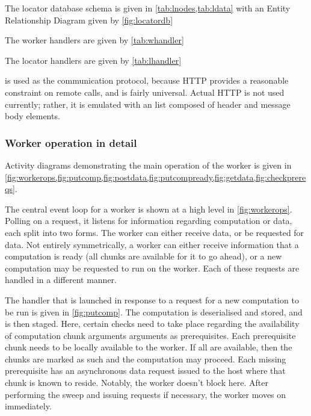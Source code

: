 



The locator database schema is given in \cref{tab:lnodes,tab:ldata} with an Entity Relationship Diagram given by \cref{fig:locatordb}




The worker handlers are given by \cref{tab:whandler}


The locator handlers are given by \cref{tab:lhandler}


 is used as the communication protocol, because HTTP provides a reasonable constraint on remote calls, and is fairly universal.
Actual HTTP is not used currently; rather, it is emulated with an \R{} list composed of header and message body elements.

\subsubsection{Worker operation in detail}

Activity diagrams demonstrating the main operation of the worker is given in \cref{fig:workerops,fig:putcomp,fig:postdata,fig:putcompready,fig:getdata,fig:checkprereqs}.

The central event loop for a worker is shown at a high level in \cref{fig:workerops}.
Polling on a request, it listens for information regarding computation or data, each split into two forms.
The worker can either receive data, or be requested for data.
Not entirely symmetrically, a worker can either receive information that a computation is ready (all chunks are available for it to go ahead), or a new computation may be requested to run on the worker.
Each of these requests are handled in a different manner.


The handler that is launched in response to a request for a new computation to be run is given in \cref{fig:putcomp}.
The computation is deserialised and stored, and is then staged.
Here, certain checks need to take place regarding the availability of computation chunk arguments arguments as prerequisites.
Each prerequisite chunk needs to be locally available to the worker.
If all are available, then the chunks are marked as such and the computation may proceed.
Each missing prerequisite has an asynchronous data request issued to the host where that chunk is known to reside.
Notably, the worker doesn't block here.
After performing the sweep and issuing requests if necessary, the worker moves on immediately.

